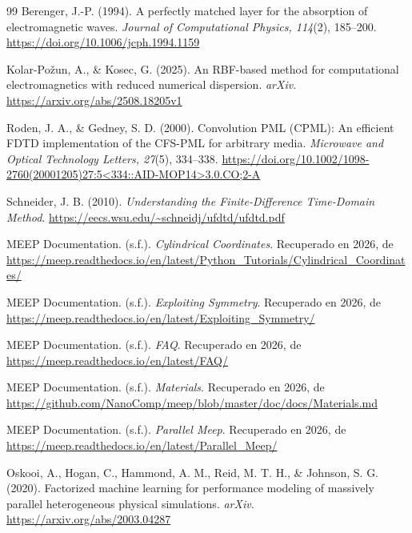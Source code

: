 \begin{thebibliography}{99}
Berenger, J.-P. (1994). A perfectly matched layer for the absorption of electromagnetic waves. \textit{Journal of Computational Physics, 114}(2), 185--200. \url{https://doi.org/10.1006/jcph.1994.1159}

Kolar-Po\v{z}un, A., \& Kosec, G. (2025). An RBF-based method for computational electromagnetics with reduced numerical dispersion. \textit{arXiv}. \url{https://arxiv.org/abs/2508.18205v1}

Roden, J. A., \& Gedney, S. D. (2000). Convolution PML (CPML): An efficient FDTD implementation of the CFS-PML for arbitrary media. \textit{Microwave and Optical Technology Letters, 27}(5), 334--338. \url{https://doi.org/10.1002/1098-2760(20001205)27:5<334::AID-MOP14>3.0.CO;2-A}

Schneider, J. B. (2010). \textit{Understanding the Finite-Difference Time-Domain Method}. \url{https://eecs.wsu.edu/~schneidj/ufdtd/ufdtd.pdf}

MEEP Documentation. (s.f.). \textit{Cylindrical Coordinates}. Recuperado en 2026, de \url{https://meep.readthedocs.io/en/latest/Python_Tutorials/Cylindrical_Coordinates/}

MEEP Documentation. (s.f.). \textit{Exploiting Symmetry}. Recuperado en 2026, de \url{https://meep.readthedocs.io/en/latest/Exploiting_Symmetry/}

MEEP Documentation. (s.f.). \textit{FAQ}. Recuperado en 2026, de \url{https://meep.readthedocs.io/en/latest/FAQ/}

MEEP Documentation. (s.f.). \textit{Materials}. Recuperado en 2026, de \url{https://github.com/NanoComp/meep/blob/master/doc/docs/Materials.md}

MEEP Documentation. (s.f.). \textit{Parallel Meep}. Recuperado en 2026, de \url{https://meep.readthedocs.io/en/latest/Parallel_Meep/}

Oskooi, A., Hogan, C., Hammond, A. M., Reid, M. T. H., \& Johnson, S. G. (2020). Factorized machine learning for performance modeling of massively parallel heterogeneous physical simulations. \textit{arXiv}. \url{https://arxiv.org/abs/2003.04287}


\end{thebibliography}
